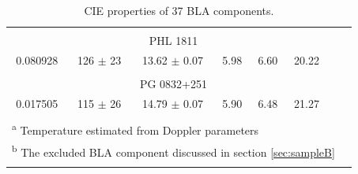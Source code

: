 \begin{longtable}{cccccccc}
            \hline \tabularnewline

            \multicolumn{7}{c}{PHL 1811} \\ \hline 

            0.080928  &  126 $\pm$ 23  &  13.62 $\pm$ 0.07  &  5.98  &  6.60  &  20.22  &   \\

            \hline \tabularnewline

            \multicolumn{7}{c}{PG 0832+251} \\ \hline 

            0.017505  &  115 $\pm$ 26  &  14.79 $\pm$ 0.07  &  5.90  &  6.48  &  21.27  &   \\

            \hline
      
           \tabularnewline \hline \hline 

           \multicolumn{7}{l}{\textsuperscript{a} \footnotesize{Temperature estimated from Doppler parameters}} \\ 
           \multicolumn{7}{l}{\textsuperscript{b} \footnotesize{The excluded BLA component discussed in section \ref{sec:sampleB}}} \\ 

    \caption{CIE properties of 37 BLA components.}
    \label{tab:CIE-properties}
\end{longtable}



